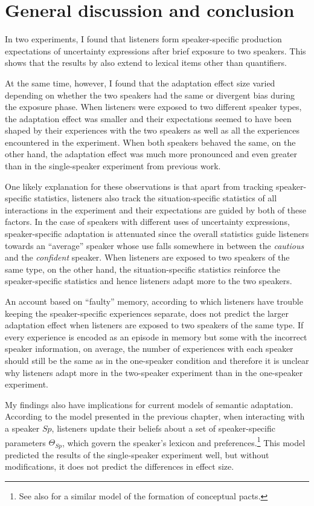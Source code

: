 \section{General discussion and conclusion}

In two experiments, I found that listeners form speaker-specific production expectations of 
uncertainty expressions after brief exposure to two speakers. This shows that the results
by \textcite{Yildirim2016} also extend to lexical items other than quantifiers. 

At the same time, however, I found that the adaptation effect size varied depending on 
whether the two speakers had the same or divergent bias during the exposure phase.
When listeners were exposed to two different speaker types, the adaptation effect was smaller
and their expectations seemed to have been shaped by their experiences with the two speakers as well as all the experiences encountered in the experiment.
When both speakers behaved the same, on the other hand, the adaptation effect was much 
more pronounced and even greater than in the single-speaker experiment from previous work.

One likely explanation for these observations is that apart from tracking speaker-specific statistics,
listeners also track the situation-specific statistics of all interactions in the experiment and their expectations
are guided by both of these factors. In the case of speakers with different uses of uncertainty expressions,
speaker-specific adaptation is attenuated since the overall statistics guide listeners towards an ``average''
speaker whose use falls somewhere in between the \textit{cautious} and the \textit{confident} speaker. When listeners
are exposed to two speakers of the same type, on the other hand, the situation-specific statistics reinforce
the speaker-specific statistics and hence listeners adapt more to the two speakers. 

An account based on ``faulty'' memory, according to which listeners have trouble keeping the 
speaker-specific experiences separate, does not predict the larger adaptation effect
when listeners are exposed to two speakers of the same type. If every experience
is encoded as an episode in memory but some with the incorrect speaker information, on average,
the number of experiences with each speaker should still be the same as in the one-speaker
condition and therefore it is unclear why listeners adapt more in the two-speaker experiment than
in the one-speaker experiment.

My findings also have implications for current models of semantic adaptation. According to the model presented in the previous chapter, when interacting with a speaker 
$Sp$, listeners update their beliefs about a set of speaker-specific parameters $\Theta_{Sp}$, which govern the speaker's lexicon and preferences.\footnote{See 
also \cite{Hawkins2017} for a similar model of the formation of conceptual pacts.} 
This model predicted the results of the single-speaker experiment well, but without modifications, it does not
predict the differences in effect size.

